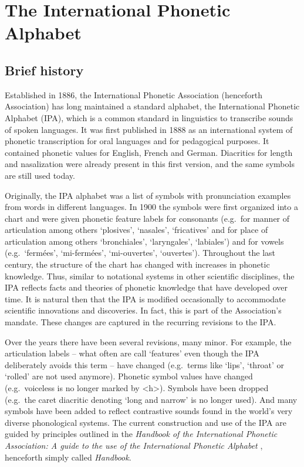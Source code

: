 \chapter{The International Phonetic Alphabet}
\label{the-international-phonetic-alphabet}


\section{Brief history}
\label{IPAhistory}

Established in 1886, the International Phonetic Association (henceforth
Association) has long maintained a standard alphabet, the International Phonetic
Alphabet (IPA), which is a common standard in linguistics to transcribe sounds
of spoken languages. It was first published in 1888 as an international system
of phonetic transcription for oral languages and for pedagogical purposes. It
contained phonetic values for English, French and German. Diacritics for length
and nasalization were already present in this first version, and the same
symbols are still used today. 

Originally, the IPA alphabet was a list of symbols with pronunciation examples
from words in different languages. In 1900 the symbols were first organized into
a chart and were given phonetic feature labels for consonants (e.g.\ for manner
of articulation among others `plosives', `nasales', `fricatives' and for place
of articulation among others `bronchiales', `laryngales', `labiales') and for
vowels (e.g.\ `fermées', `mi-fermées', `mi-ouvertes', `ouvertes'). Throughout
the last century, the structure of the chart has changed with increases in
phonetic knowledge. Thus, similar to notational systems in other scientific
disciplines, the IPA reflects facts and theories of phonetic knowledge that have
developed over time. It is natural then that the IPA is modified occasionally to
accommodate scientific innovations and discoveries. In fact, this is part of the
Association's mandate. These changes are captured in the recurring revisions to
the IPA.

Over the years there have been several revisions, many minor. For example, the
articulation labels -- what often are call `features' even though the IPA
deliberately avoids this term -- have changed (e.g.\ terms like `lips', `throat'
or `rolled' are not used anymore). Phonetic symbol values have changed (e.g.\
voiceless is no longer marked by <h>). Symbols have been dropped (e.g.\ the
caret diacritic denoting `long and narrow' is no longer used). And many symbols
have been added to reflect contrastive sounds found in the world's very diverse
phonological systems. The current construction and use of the IPA are guided by
principles outlined in the \textit{Handbook of the International Phonetic
Association: A guide to the use of the International Phonetic Alphabet}
\citep[159]{IPA1999}, henceforth simply called \textit{Handbook}. 

